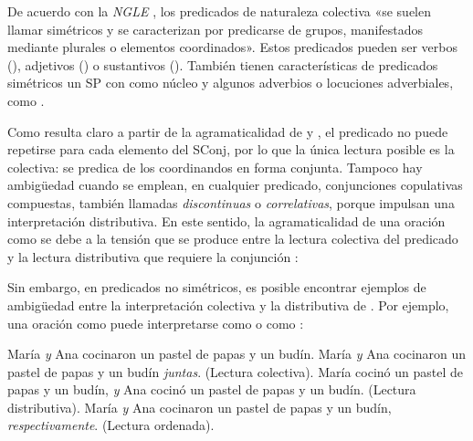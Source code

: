\begin{recuadro}
De acuerdo con la \textit{NGLE} \parencite[§\,31.6c]{rae2025}, los predicados de
naturaleza colectiva «se suelen llamar simétricos y se caracterizan por
predicarse de grupos, manifestados mediante plurales o elementos coordinados».
Estos predicados pueden ser verbos (), adjetivos () o sustantivos
(). También tienen
características de predicados simétricos un SP con  como núcleo y
algunos adverbios o locuciones adverbiales, como .
\end{recuadro}

Como resulta claro a partir de la agramaticalidad de  y
, el predicado no puede repetirse para cada elemento del
SConj, por lo que la única lectura posible es la colectiva: se predica de los
coordinandos en forma conjunta. Tampoco hay ambigüedad cuando se emplean, en
cualquier predicado, conjunciones copulativas compuestas, también llamadas
\textit{discontinuas} o \textit{correlativas}, porque impulsan una
interpretación distributiva. En este sentido, la agramaticalidad de una oración
como  se debe a la tensión que se produce entre la lectura
colectiva del predicado  y la lectura distributiva que
requiere la conjunción :

\begin{exe}
\end{exe}

Sin embargo, en predicados no simétricos, es posible encontrar ejemplos de
ambigüedad entre la interpretación colectiva y la distributiva de . Por
ejemplo, una oración como  puede interpretarse como
 o como :

\begin{exe}
  \ex
    \begin{xlist}
      \ex\label{ex:12-pastel-a} María \textit{y} Ana cocinaron un pastel de papas
          y un budín.
      \ex\label{ex:12-pastel-b} María \textit{y} Ana cocinaron un pastel de papas
          y un budín \textit{juntas}. (Lectura colectiva).
      \ex\label{ex:12-pastel-c} María cocinó un pastel de papas y un budín,
          \textit{y} Ana cocinó un pastel de papas y un budín. (Lectura
          distributiva).
      \ex\label{ex:12-pastel-d} María \textit{y} Ana cocinaron un pastel de papas
          y un budín, \textit{respectivamente}. (Lectura ordenada).
    \end{xlist}
\end{exe}


